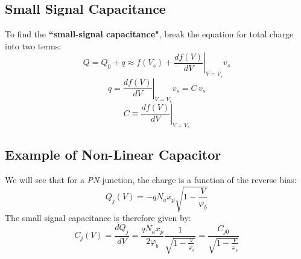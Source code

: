 \subsection{Small Signal Capacitance}
To find the \textbf{``small-signal capacitance"}, break the equation for total charge into two terms:
    \begin{equation} 
        Q = {Q_0} + q \approx f({V_s}) + {\left. {\frac{{df(V)}}{{dV}}} \right|_{V = {V_s}}}{v_s} 
    \end{equation}
    \begin{equation} 
        q = {\left. {\frac{{df(V)}}{{dV}}} \right|_{V = {V_s}}}{v_s} = C\,{v_s} 
    \end{equation}
    \begin{equation} 
        C \equiv {\left. {\frac{{df(V)}}{{dV}}} \right|_{V = {V_s}}} 
    \end{equation}
\subsection{Example of Non-Linear Capacitor}
We will see that for a \emph{PN}-junction, the charge is a function of the reverse bias:
    \begin{equation} 
        {Q_j}(V) =  - q{N_a}{x_p}\sqrt {1 - \frac{V}{{{\varphi _b}}}} 
    \end{equation}
The small signal capacitance is therefore given by:
    \begin{equation} 
        {C_j}(V) = \frac{{dQ_j^{}}}{{dV}} = \frac{{q{N_a}{x_p}}}{{2{\varphi _b}}}\frac{1}{{\sqrt {1 - \frac{V}{{{\varphi _b}}}}}} = \frac{{C_{j0}^{}}}{{\sqrt {1 - \frac{V}{{{\varphi _b}}}}}} 
    \end{equation}
